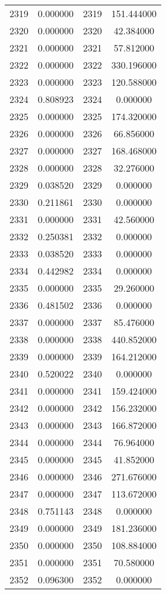 \documentclass[12pt]{article}
\begin{document}
\begin{longtable}{@{}cccc@{}}
2319 & 0.000000 & 2319 & 151.444000 \\
2320 & 0.000000 & 2320 & 42.384000 \\
2321 & 0.000000 & 2321 & 57.812000 \\
2322 & 0.000000 & 2322 & 330.196000 \\
2323 & 0.000000 & 2323 & 120.588000 \\
2324 & 0.808923 & 2324 & 0.000000 \\
2325 & 0.000000 & 2325 & 174.320000 \\
2326 & 0.000000 & 2326 & 66.856000 \\
2327 & 0.000000 & 2327 & 168.468000 \\
2328 & 0.000000 & 2328 & 32.276000 \\
2329 & 0.038520 & 2329 & 0.000000 \\
2330 & 0.211861 & 2330 & 0.000000 \\
2331 & 0.000000 & 2331 & 42.560000 \\
2332 & 0.250381 & 2332 & 0.000000 \\
2333 & 0.038520 & 2333 & 0.000000 \\
2334 & 0.442982 & 2334 & 0.000000 \\
2335 & 0.000000 & 2335 & 29.260000 \\
2336 & 0.481502 & 2336 & 0.000000 \\
2337 & 0.000000 & 2337 & 85.476000 \\
2338 & 0.000000 & 2338 & 440.852000 \\
2339 & 0.000000 & 2339 & 164.212000 \\
2340 & 0.520022 & 2340 & 0.000000 \\
2341 & 0.000000 & 2341 & 159.424000 \\
2342 & 0.000000 & 2342 & 156.232000 \\
2343 & 0.000000 & 2343 & 166.872000 \\
2344 & 0.000000 & 2344 & 76.964000 \\
2345 & 0.000000 & 2345 & 41.852000 \\
2346 & 0.000000 & 2346 & 271.676000 \\
2347 & 0.000000 & 2347 & 113.672000 \\
2348 & 0.751143 & 2348 & 0.000000 \\
2349 & 0.000000 & 2349 & 181.236000 \\
2350 & 0.000000 & 2350 & 108.884000 \\
2351 & 0.000000 & 2351 & 70.580000 \\
2352 & 0.096300 & 2352 & 0.000000 \\

\end{longtable}
\end{document}
